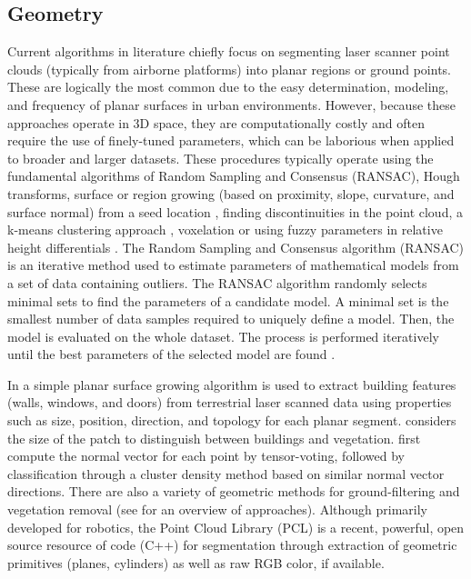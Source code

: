 \documentclass[final,3p,times,twocolumn,authoryear]{elsarticle}
\begin{document}
\subsection{Geometry}
Current algorithms in literature chiefly focus on segmenting laser scanner point clouds (typically from airborne platforms) into planar regions or ground points. These are logically the most common due to the easy determination, modeling, and frequency of planar surfaces in urban environments. However, because these approaches operate in 3D space, they are computationally costly and often require the use of finely-tuned parameters, which can be laborious when applied to broader and larger datasets. These procedures typically operate using the fundamental algorithms of Random Sampling and Consensus (RANSAC), Hough transforms, surface or region growing (based on proximity, slope, curvature, and surface normal) from a seed location \cite{rabbani2006}, finding discontinuities \cite{wang2009} in the point cloud, a k-means clustering approach \cite{chehata2008}, voxelation \cite{douillard2011} or using fuzzy parameters in relative height differentials \cite{biosca2008}. 
The Random Sampling and Consensus algorithm (RANSAC) is an iterative method used to estimate parameters of mathematical models from a set of data containing outliers. The RANSAC algorithm randomly selects minimal sets to find the parameters of a candidate model. A minimal set is the smallest number of data samples required to uniquely define a model. Then, the model is evaluated on the whole dataset. The process is performed iteratively until the best parameters of the selected model are found \cite{vosselman2010}.

In \cite{pu2006} a simple planar surface growing algorithm is used to extract building features (walls, windows, and doors) from terrestrial laser scanned data using properties such as size, position, direction, and topology for each planar segment. \cite{moussa2010} considers the size of the patch to distinguish between buildings and vegetation. \cite{lin2006} first compute the normal vector for each point by tensor-voting, followed by classification through a cluster density method based on similar normal vector directions. There are also a variety of geometric methods for ground-filtering and vegetation removal (see \cite{vosselman2010} for an overview of approaches). Although primarily developed for robotics, the Point Cloud Library (PCL) \cite{pcl} is a recent, powerful, open source resource of code (C++) for segmentation through extraction of geometric primitives (planes, cylinders) as well as raw RGB color, if available. 
\end{document}

